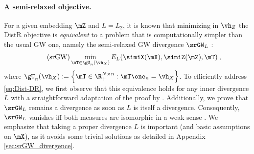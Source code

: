 \paragraph{A semi-relaxed objective.} For a given embedding $\mZ$ and $L=L_2$, it is known that minimizing in $\vh_{Z}$ the DistR objective is \emph{equivalent} to a problem that is computationally simpler than the usual GW one, namely the semi-relaxed GW divergence $\srGW_L$ \citep{vincent2021semi}:
\begin{equation*}\tag{srGW} \label{eq:srGW}
	\min_{\mT \in \gU_n(\vh_X)} E_L(\simiX(\mX), \simiZ(\mZ), \mT) \:,
\end{equation*}
where $\gU_n(\vh_X) := \left\{ \mT \in \R_{+}^{N \times n}: \mT \one_n = \vh_X\right\}$. To efficiently address \cref{eq:Dist-DR}, we first observe that this equivalence holds for any inner divergence $L$ with a straightforward adaptation of the proof by \citet{vincent2021semi}.
Additionally, we prove that $\srGW_L$ remains a divergence as soon as $L$ is itself a divergence. Consequently, $\srGW_L$ vanishes iff both measures are isomorphic in a weak sense \citep{chowdhury2019gromov}. We emphasize that taking a proper divergence $L$ is important (and basic assumptions on $\mX$), as it avoids some trivial solutions as detailed in Appendix \ref{sec:srGW_divergence}.






